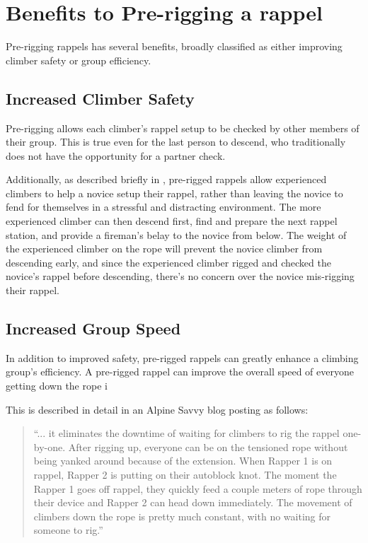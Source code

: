 \documentclass[nonacm,acmtog]{acmart}
\begin{document}
\section{Benefits to Pre-rigging a rappel}
\label{sec:benefits}

  Pre-rigging rappels has several benefits, broadly classified as either
  improving climber safety or group efficiency.

\subsection{Increased Climber Safety}

  Pre-rigging allows each climber's rappel setup to be checked by other members
  of their group.  This is true even for the last person to descend, who
  traditionally does not have the opportunity for a partner check.

  Additionally, as described briefly in , pre-rigged rappels
  allow experienced climbers to help a novice setup their rappel, rather than
  leaving the novice to fend for themselves in a stressful and distracting
  environment.  The more experienced climber can then descend first, find and
  prepare the next rappel station, and provide a fireman's belay to the
  novice from below.  The weight of the experienced climber on the rope will
  prevent the novice climber from descending early, and since the experienced
  climber rigged and checked the novice's rappel before descending, there's no
  concern over the novice mis-rigging their rappel.

\subsection{Increased Group Speed}

  In addition to improved safety, pre-rigged rappels can greatly enhance a
  climbing group's efficiency.  A pre-rigged rappel can improve the overall
  speed of everyone getting down the rope i

  This is described in detail in an Alpine Savvy blog posting as
  follows\cite{alpinesavvy:pre-rigged-rappels}:

  \begin{quote}
  ``... it eliminates the downtime of waiting for climbers to rig the rappel
  one-by-one.  After rigging up, everyone can be on the tensioned rope without
  being yanked around because of the extension. When Rapper 1 is on rappel,
  Rapper 2 is putting on their autoblock knot. The moment the Rapper 1 goes off
  rappel, they quickly feed a couple meters of rope through their device and
  Rapper 2 can head down immediately. The movement of climbers down the rope is
  pretty much constant, with no waiting for someone to rig.''
  \end{quote}
\end{document}
